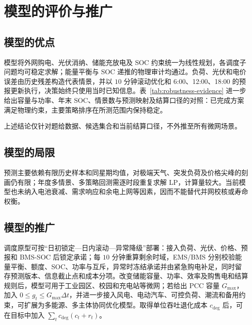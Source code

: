 \section{模型的评价与推广}
\label{sec:evaluation}

\subsection{模型的优点}

模型将外网购电、光伏消纳、储能充放电及 SOC 约束统一为线性规划，各调度子问题均可稳定求解；能量平衡与 SOC 递推的物理审计均通过。负荷、光伏和电价误差由历史残差构造代表情景，并以 $10$ 分钟滚动优化和 6:00、12:00、18:00 的预报更新执行，决策始终只使用当时已知信息。表~\ref{tab:robustness-evidence} 进一步给出容量与功率、年末 SOC、情景数与预测映射及结算口径的对照：已完成方案满足物理约束，主要策略排序在所测范围内保持稳定。



上述结论仅针对题给数据、候选集合和当前结算口径，不外推至所有微网场景。

\subsection{模型的局限}

预测主要依赖有限历史样本和同星期均值，对极端天气、突发负荷及价格尖峰的刻画仍有限；年度多情景、多策略回测需逐时段重复求解 LP，计算量较大。当前模型也未纳入电池衰减、需求响应和余电上网等因素，因而不能替代并网校核或寿命权衡。

\subsection{模型的推广}

调度原型可按“日初锁定—日内滚动—异常降级”部署：接入负荷、光伏、价格、预报和 BMS-SOC 后锁定承诺；每 $10$ 分钟重算剩余时域，EMS/BMS 分别校验能量平衡、额度、SOC、功率与互斥，异常时冻结承诺并由紧急购电补足，同时留存预测版本、信息截止点和成本分项。改变储能容量、功率、效率及购售电和结算规则后，模型可用于工业园区、校园和充电站等微网；若给出 PCC 容量 $G_{\max}$，加入 $0\le g_t\le G_{\max}\Delta t$，并进一步接入风电、电动汽车、可控负荷、潮流和备用约束，可扩展为多能源、多主体协同优化模型。取得单位吞吐退化成本 $c_{\mathrm{deg}}$ 后，可在目标中加入 $\sum_t c_{\mathrm{deg}}(c_t+r_t)$。
